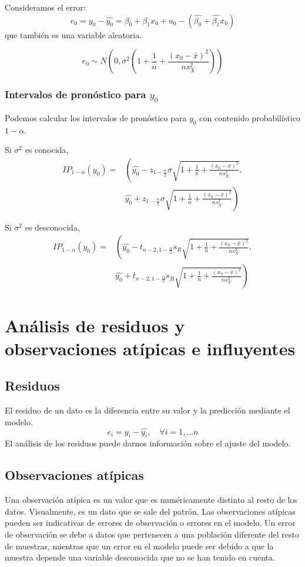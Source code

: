 Consideramos el error:
$$e_0 = y_0 - \hat{y_0} = \beta_0 + \beta_1x_0 + u_0 - (\hat{\beta_0} + \hat{\beta_1}x_0)$$
que también es una variable aleatoria.

\begin{theorem}
    $$e_0 \sim N\left( 0, \sigma^2 \left(1+\frac{1}{n}+\frac{(x_0-\bar{x})^2}{ns_X^2} \right) \right)$$
\end{theorem}

\subsubsection*{Intervalos de pronóstico para $y_0$}
Podemos calcular los intervalos de pronóstico para $y_0$ con contenido probabilístico $1-\alpha$.

Si $\sigma^2$ es conocida,
\begin{align*}
    IP_{1-\alpha}(y_0) = & \left( \hat{y_0} - z_{1-\frac{\alpha}{2}} \sigma \sqrt{1 + \frac{1}{n} + \frac{(x_0-\bar{x})^2}{ns_X^2}}, \right. \\
                         & \left. \hat{y_0} + z_{1-\frac{\alpha}{2}} \sigma \sqrt{1 + \frac{1}{n} + \frac{(x_0-\bar{x})^2}{ns_X^2}} \right)
\end{align*}

Si $\sigma^2$ es desconocida,
\begin{align*}
    IP_{1-\alpha}(y_0) = & \left( \hat{y_0} - t_{n-2, 1-\frac{\alpha}{2}} s_R \sqrt{1 + \frac{1}{n} + \frac{(x_0-\bar{x})^2}{ns_X^2}}, \right. \\
                         & \left. \hat{y_0} + t_{n-2, 1-\frac{\alpha}{2}} s_R \sqrt{1 + \frac{1}{n} + \frac{(x_0-\bar{x})^2}{ns_X^2}} \right)
\end{align*}

\section{Análisis de residuos y observaciones atípicas e influyentes}
\subsection*{Residuos}
El residuo de un dato es la diferencia entre su valor y la predicción mediante el modelo.
$$e_i = y_i - \hat{y_i}, \quad \forall i = 1, \dots n$$
El análisis de los residuos puede darnos información sobre el ajuste del modelo.

\subsection*{Observaciones atípicas}
Una observación atípica es un valor que es numéricamente distinto al resto de los datos.
Visualmente, es un dato que se sale del patrón.
Las observaciones atípicas pueden ser indicativas de errores de observación o errores en el modelo.
Un error de observación se debe a datos que pertenecen a una población diferente del resto de muestras, mientras que un error en el modelo puede ser debido a que la muestra depende una variable desconocida que no se han tenido en cuenta.


